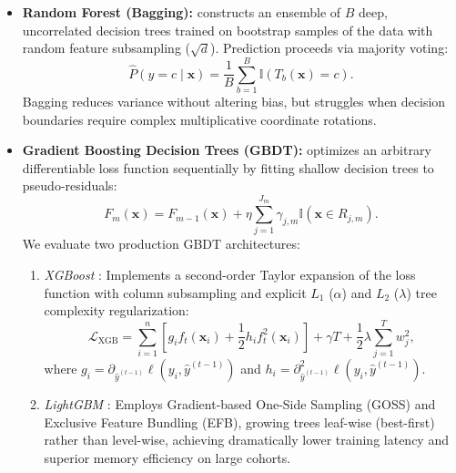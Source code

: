\documentclass[11pt,a4paper]{article}
\begin{document}
\begin{itemize}[leftmargin=*,itemsep=1pt]
    \item \textbf{Random Forest (Bagging):} \citet{breiman2001} constructs an ensemble of $B$ deep, uncorrelated decision trees trained on bootstrap samples of the data with random feature subsampling ($\sqrt{d}$). Prediction proceeds via majority voting:
    \begin{equation}
    \hat{P}(y = c \mid \mathbf{x}) = \frac{1}{B} \sum_{b=1}^B \mathbb{I}\left(T_b(\mathbf{x}) = c\right).
    \end{equation}
    Bagging reduces variance without altering bias, but struggles when decision boundaries require complex multiplicative coordinate rotations.
    \item \textbf{Gradient Boosting Decision Trees (GBDT):} \citet{friedman2001} optimizes an arbitrary differentiable loss function sequentially by fitting shallow decision trees to pseudo-residuals:
    \begin{equation}
    F_m(\mathbf{x}) = F_{m-1}(\mathbf{x}) + \eta \sum_{j=1}^{J_m} \gamma_{j,m} \mathbb{I}(\mathbf{x} \in R_{j,m}).
    \end{equation}
    We evaluate two production GBDT architectures:
    \begin{enumerate}[leftmargin=*,itemsep=1pt]
        \item \emph{XGBoost} \citep{chen2016}: Implements a second-order Taylor expansion of the loss function with column subsampling and explicit $L_1$ ($\alpha$) and $L_2$ ($\lambda$) tree complexity regularization:
        \begin{equation}
        \mathcal{L}_{\text{XGB}} = \sum_{i=1}^n \left[ g_i f_t(\mathbf{x}_i) + \frac{1}{2} h_i f_t^2(\mathbf{x}_i) \right] + \gamma T + \frac{1}{2} \lambda \sum_{j=1}^T w_j^2,
        \end{equation}
        where $g_i = \partial_{\hat{y}^{(t-1)}} \ell(y_i, \hat{y}^{(t-1)})$ and $h_i = \partial^2_{\hat{y}^{(t-1)}} \ell(y_i, \hat{y}^{(t-1)})$.
        \item \emph{LightGBM} \citep{ke2017}: Employs Gradient-based One-Side Sampling (GOSS) and Exclusive Feature Bundling (EFB), growing trees leaf-wise (best-first) rather than level-wise, achieving dramatically lower training latency and superior memory efficiency on large cohorts.
    \end{enumerate}
\end{itemize}
\end{document}
